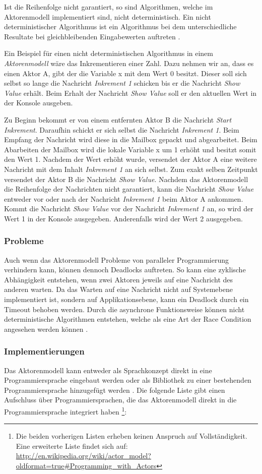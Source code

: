 Ist die Reihenfolge nicht garantiert, so sind Algorithmen, welche im Aktorenmodell implementiert sind, nicht deterministisch. Ein nicht deterministischer Algorithmus ist ein Algorithmus bei dem unterschiedliche Resultate bei gleichbleibenden Eingabewerten auftreten \cite[]{Agh85}. 

Ein Beispiel für einen nicht deterministischen Algorithmus in einem \emph{Aktorenmodell} wäre das Inkrementieren einer Zahl. Dazu nehmen wir an, dass es einen Aktor A, gibt der die Variable x mit dem Wert 0 besitzt. Dieser soll sich selbst so lange die Nachricht \emph{Inkrement 1} schicken bis er die Nachricht \emph{Show Value} erhält. Beim Erhalt der Nachricht \emph{Show Value} soll er den aktuellen Wert in der Konsole ausgeben.

Zu Beginn bekommt er von einem entfernten Aktor B die Nachricht \emph{Start Inkrement}. Daraufhin schickt er sich selbst die Nachricht \emph{Inkrement 1}. Beim Empfang der Nachricht wird diese in die Mailbox gepackt und abgearbeitet. Beim Abarbeiten der Mailbox wird die lokale Variable x um 1 erhöht und besitzt somit den Wert 1. Nachdem der Wert erhöht wurde, versendet der Aktor A eine weitere Nachricht mit dem Inhalt \emph{Inkrement 1} an sich selbst. Zum exakt selben Zeitpunkt versendet der Aktor B die Nachricht \emph{Show Value}. Nachdem das Aktorenmodell die Reihenfolge der Nachrichten nicht garantiert, kann die Nachricht \emph{Show Value} entweder vor oder nach der Nachricht \emph{Inkrement 1} beim Aktor A ankommen. Kommt die Nachricht \emph{Show Value} vor der Nachricht \emph{Inkrement 1} an, so wird der Wert 1 in der Konsole ausgegeben. Anderenfalls wird der Wert 2 ausgegeben.

\subsubsection{Probleme}
Auch wenn das Aktorenmodell Probleme von paralleler Programmierung verhindern kann, können dennoch Deadlocks auftreten. So kann eine zyklische Abhängigkeit entstehen, wenn zwei Aktoren jeweils auf eine Nachricht des anderen warten. Da das Warten auf eine Nachricht nicht auf Systemebene implementiert ist, sondern auf Applikationsebene, kann ein Deadlock durch ein Timeout behoben werden. Durch die asynchrone Funktionsweise können nicht deterministische Algorithmen entstehen, welche als eine Art der Race Condition angesehen werden können \cite[p. 86]{Erb2012}.

\subsubsection{Implementierungen}
Das Aktorenmodell kann entweder als Sprachkonzept direkt in eine Programmiersprache eingebaut werden oder als Bibliothek zu einer bestehenden Programmiersprache hinzugefügt werden  \cite[p. 86]{Erb2012}. Die folgende Liste gibt einen Aufschluss über Programmiersprachen, die das Aktorenmodell direkt in die Programmiersprache integriert haben \footnote{Die beiden vorherigen Listen erheben keinen Anspruch auf Vollständigkeit. Eine erweiterte Liste findet sich auf: \url{http://en.wikipedia.org/wiki/actor_model?oldformat=true#Programming_with_Actors}}:


